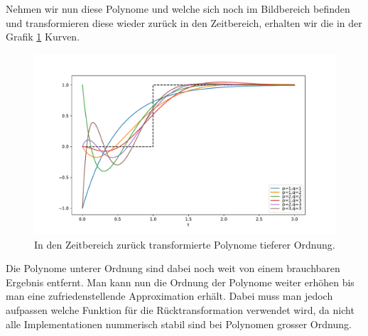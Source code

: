 Nehmen wir nun diese Polynome und welche sich noch im Bildbereich befinden und transformieren diese wieder zurück in den Zeitbereich, erhalten wir die in der Grafik \ref{pade:totzeitexp2} Kurven.
\begin{figure}
	\centering
	\includegraphics[width=1\linewidth]{./papers/pade/python/bilder/padelow33.pdf}
	\caption{In den Zeitbereich zurück transformierte Polynome tieferer Ordnung\label{pade:totzeitexp2}.}
\end{figure}

Die Polynome unterer Ordnung sind dabei noch weit von einem brauchbaren Ergebnis entfernt.
Man kann nun die Ordnung der Polynome weiter erhöhen bis man eine zufriedenstellende Approximation erhält.
Dabei muss man jedoch aufpassen welche Funktion für die Rücktransformation verwendet wird, da nicht alle Implementationen nummerisch stabil sind bei Polynomen grosser Ordnung.

